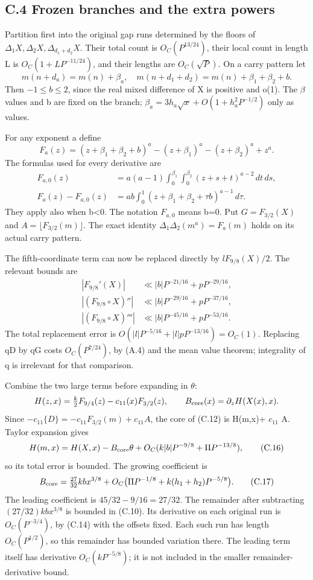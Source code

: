 \documentclass[11pt,a4paper]{article}
\begin{document}
\subsection{C.4 Frozen branches and the extra
powers}\label{c.4-frozen-branches-and-the-extra-powers}

Partition first into the original gap runs determined by the floors of
\(\Delta_1X,\Delta_2X,\Delta_{d_1+d_2}X\). Their total count is
\(O_C(P^{13/24})\), their local count in length L is
\(O_C(1+LP^{-11/24})\), and their lengths are \(O_C(\sqrt P)\). On a
carry pattern let \[
m(n+d_a)=m(n)+\beta_a,\quad
m(n+d_1+d_2)=m(n)+\beta_1+\beta_2+b .
\] Then \(-1\le b\le2\), since the real mixed difference of X is
positive and o(1). The \(\beta\) values and b are fixed on the branch;
\(\beta_a=3h_a\sqrt x+O(1+h_a^2P^{-1/2})\) only as values.

For any exponent a define \[
F_a(z)=(z+\beta_1+\beta_2+b)^a
-(z+\beta_1)^a-(z+\beta_2)^a+z^a .
\] The formulas used for every derivative are \[
\begin{split}
F_{a,0}(z)&=a(a-1)\int_0^{\beta_1}\int_0^{\beta_2}
(z+s+t)^{a-2}\,dt\,ds,\\
F_a(z)-F_{a,0}(z)&=ab\int_0^1
(z+\beta_1+\beta_2+\tau b)^{a-1}\,d\tau .
\end{split}\tag{C.14}
\] They apply also when b\textless0. The notation \(F_{a,0}\) means b=0.
Put \(G=F_{3/2}(X)\) and \(A=\lfloor F_{3/2}(m)\rfloor\). The exact
identity \(\Delta_1\Delta_2(m^a)=F_a(m)\) holds on its actual carry
pattern.

The fifth-coordinate term can now be replaced directly by
\(lF_{9/8}(X)/2\). The relevant bounds are \[
\begin{split}
|F_{9/8}'(X)|&\ll |b|P^{-21/16}+pP^{-29/16},\\
|(F_{9/8}\circ X)''|&\ll |b|P^{-29/16}+pP^{-37/16},\\
|(F_{9/8}\circ X)'''|&\ll |b|P^{-45/16}+pP^{-53/16}.
\end{split}\tag{C.15}
\] The total replacement error is
\(O(|l|P^{-5/16}+|l|pP^{-13/16})=O_C(1)\). Replacing qD by qG costs
\(O_C(P^{7/24})\), by (A.4) and the mean value theorem; integrality of q
is irrelevant for that comparison.

Combine the two large terms before expanding in \(\theta\): \[
H(z,x)=\tfrac k2F_{9/4}(z)-c_{11}(x)F_{3/2}(z),\qquad
B_{\rm core}(x)=\partial_zH(X(x),x).
\] Since \(-c_{11}\{D\}=-c_{11}F_{3/2}(m)+c_{11}A\), the core of (C.12)
is H(m,x)+ \(c_{11}\) A. Taylor expansion gives \[
H(m,x)=H(X,x)-B_{\rm core}\theta
+O_C(k|b|P^{-9/8}+\Pi P^{-13/8}), \tag{C.16}
\] so its total error is bounded. The growing coefficient is \[
B_{\rm core}
=\tfrac{27}{32}kb x^{3/8}
+O_C\bigl(\Pi P^{-1/8}+k(h_1+h_2)P^{-5/8}\bigr). \tag{C.17}
\] The leading coefficient is \(45/32-9/16=27/32\). The remainder after
subtracting \((27/32)kb x^{3/8}\) is bounded in (C.10). Its derivative
on each original run is \(O_C(P^{-3/4})\), by (C.14) with the offsets
fixed. Each such run has length \(O_C(P^{1/2})\), so this remainder has
bounded variation there. The leading term itself has derivative
\(O_C(kP^{-5/8})\); it is not included in the smaller
remainder-derivative bound.
\end{document}
